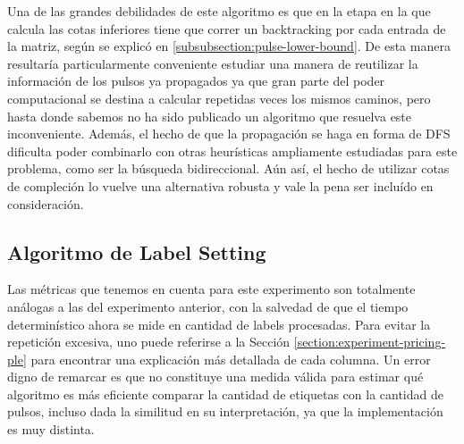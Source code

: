 Una de las grandes debilidades de este algoritmo es que en la etapa en la que calcula las cotas inferiores tiene que correr un backtracking por cada entrada de la matriz, según se explicó en \ref{subsubsection:pulse-lower-bound}. De esta manera resultaría particularmente conveniente estudiar una manera de reutilizar la información de los pulsos ya propagados ya que gran parte del poder computacional se destina a calcular repetidas veces los mismos caminos, pero hasta donde sabemos no ha sido publicado un algoritmo que resuelva este inconveniente. Además, el hecho de que la propagación se haga en forma de DFS dificulta poder combinarlo con otras heurísticas ampliamente estudiadas para este problema, como ser la búsqueda bidireccional. Aún así, el hecho de utilizar cotas de compleción lo vuelve una alternativa robusta y vale la pena ser incluído en consideración.


\subsection{Algoritmo de Label Setting}

Las métricas que tenemos en cuenta para este experimento son totalmente análogas a las del experimento anterior, con la salvedad de que el tiempo determinístico ahora se mide en cantidad de labels procesadas. Para evitar la repetición excesiva, uno puede referirse a la Sección \ref{section:experiment-pricing-ple} para encontrar una explicación más detallada de cada columna. Un error digno de remarcar es que no constituye una medida válida para estimar qué algoritmo es más eficiente comparar la cantidad de etiquetas con la cantidad de pulsos, incluso dada la similitud en su interpretación, ya que la implementación es muy distinta. 


